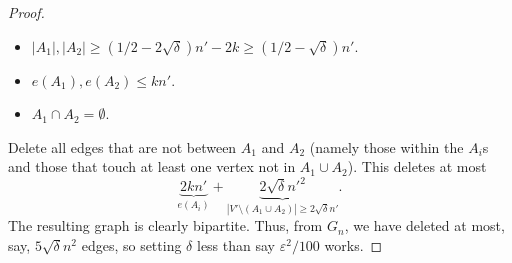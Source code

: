 \begin{proof}
				\begin{itemize}
					\item $|A_1|, |A_2| \ge (1/2 - 2\sqrt{\delta})n' - 2k \ge (1/2 - \sqrt{\delta})n'$.
					\item $e(A_1), e(A_2) \le kn'$.
					\item $A_1 \cap A_2 = \emptyset$.
				\end{itemize}
				Delete all edges that are not between $A_1$ and $A_2$ (namely those within the $A_i$s and those that touch at least one vertex not in $A_1 \cup A_2$). This deletes at most
				\[ \underbrace{2kn'}_{e(A_i)} + \underbrace{2\sqrt{\delta} n'^2}_{|V' \setminus (A_1\cup A_2)| \ge 2\sqrt{\delta}n'}. \]
				The resulting graph is clearly bipartite. Thus, from $G_n$, we have deleted at most, say, $5\sqrt{\delta}n^2$ edges, so setting $\delta$ less than say $\varepsilon^2/100$ works.
			\end{proof}

